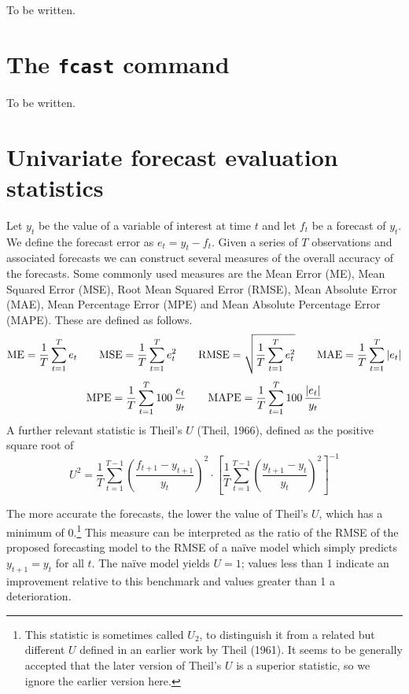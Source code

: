 To be written.

\section{The \texttt{fcast} command}
\label{sec:fcast-fcast}

To be written.

\section{Univariate forecast evaluation statistics}
\label{sec:fcast-stats}

Let $y_t$ be the value of a variable of interest at time $t$ and let
$f_t$ be a forecast of $y_t$.  We define the forecast error as $e_t =
y_t - f_t$.  Given a series of $T$ observations and associated
forecasts we can construct several measures of the overall accuracy of
the forecasts.  Some commonly used measures are the Mean Error (ME),
Mean Squared Error (MSE), Root Mean Squared Error (RMSE), Mean
Absolute Error (MAE), Mean Percentage Error (MPE) and Mean Absolute
Percentage Error (MAPE).  These are defined as follows.
%
\[ {\rm ME} = \frac{1}{T} \sum_{t=1}^T e_t \qquad 
   {\rm MSE} = \frac{1}{T} \sum_{t=1}^T e_t^2 \qquad 
   {\rm RMSE} = \sqrt{\frac{1}{T} \sum_{t=1}^T e_t^2} \qquad 
   {\rm MAE} = \frac{1}{T} \sum_{t=1}^T |e_t|
\] 
%
\[ {\rm MPE} = \frac{1}{T} \sum_{t=1}^T 100\, \frac{e_t}{y_t} \qquad
   {\rm MAPE} = \frac{1}{T} \sum_{t=1}^T 100\, \frac{|e_t|}{y_t} 
\]
%
A further relevant statistic is Theil's $U$ (Theil, 1966), defined as
the positive square root of
%
\[ 
U^2 = \frac{1}{T}
     \sum_{t=1}^{T-1} \left(\frac{f_{t+1} - y_{t+1}}{y_t}\right)^2
     \cdot \left[
     \frac{1}{T} \sum_{t=1}^{T-1} 
        \left(\frac{y_{t+1} - y_t}{y_t}\right)^2 \right]^{-1}
\]

The more accurate the forecasts, the lower the value of Theil's $U$,
which has a minimum of 0.\footnote{This statistic is sometimes called
  $U_2$, to distinguish it from a related but different $U$ defined in
  an earlier work by Theil (1961).  It seems to be generally accepted
  that the later version of Theil's $U$ is a superior statistic, so we
  ignore the earlier version here.} This measure can be interpreted as
the ratio of the RMSE of the proposed forecasting model to the RMSE of
a na\"ive model which simply predicts $y_{t+1} = y_t$ for all $t$.
The na\"ive model yields $U = 1$; values less than 1 indicate an
improvement relative to this benchmark and values greater than 1 a
deterioration.

